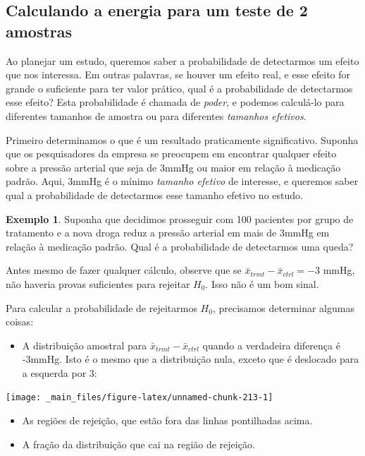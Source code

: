 \documentclass[
]{book}
\providecommand{\tightlist}{%
  \setlength{\itemsep}{0pt}\setlength{\parskip}{0pt}}
\theoremstyle{definition}
\theoremstyle{definition}
\newtheorem{example}{Exemplo}[chapter]
\theoremstyle{definition}
\theoremstyle{definition}
\theoremstyle{remark}
\begin{document}
\hypertarget{calculatingEnergyTestTwoSamples}{%
\subsection{Calculando a energia para um teste de 2 amostras}\label{calculatingEnergyTestTwoSamples}}

Ao planejar um estudo, queremos saber a probabilidade de detectarmos um efeito que nos interessa. Em outras palavras, se houver um efeito real, e esse efeito for grande o suficiente para ter valor prático, qual é a probabilidade de detectarmos esse efeito? Esta probabilidade é chamada de \emph{poder}, e podemos calculá-lo para diferentes tamanhos de amostra ou para diferentes \emph{tamanhos efetivos}.

Primeiro determinamos o que é um resultado praticamente significativo. Suponha que os pesquisadores da empresa se preocupem em encontrar qualquer efeito sobre a pressão arterial que seja de 3mmHg ou maior em relação à medicação padrão. Aqui, 3mmHg é o mínimo \emph{tamanho efetivo} de interesse, e queremos saber qual a probabilidade de detectarmos esse tamanho efetivo no estudo.

\begin{example}
\protect\hypertarget{exm:PowerFor100AtNeg3}{}{\label{exm:PowerFor100AtNeg3} }Suponha que decidimos prosseguir com 100 pacientes por grupo de tratamento e a nova droga reduz a pressão arterial em mais de 3mmHg em relação à medicação padrão. Qual é a probabilidade de detectarmos uma queda?
\end{example}

Antes mesmo de fazer qualquer cálculo, observe que se \(\bar{x}_{trmt} - \bar{x}_{ctrl} = -3\) mmHg, não haveria provas suficientes para rejeitar \(H_0\). Isso não é um bom sinal.

Para calcular a probabilidade de rejeitarmos \(H_0\), precisamos determinar algumas coisas:

\begin{itemize}
\tightlist
\item
  A distribuição amostral para \(\bar{x}_{trmt} - \bar{x}_{ctrl}\) quando a verdadeira diferença é -3mmHg. Isto é o mesmo que a distribuição nula, exceto que é deslocado para a esquerda por 3:
\end{itemize}

\texttt{[image: \_main\_files/figure-latex/unnamed-chunk-213-1]}

\begin{itemize}
\item
  As regiões de rejeição, que estão fora das linhas pontilhadas acima.
\item
  A fração da distribuição que cai na região de rejeição.
\end{itemize}
\end{document}
